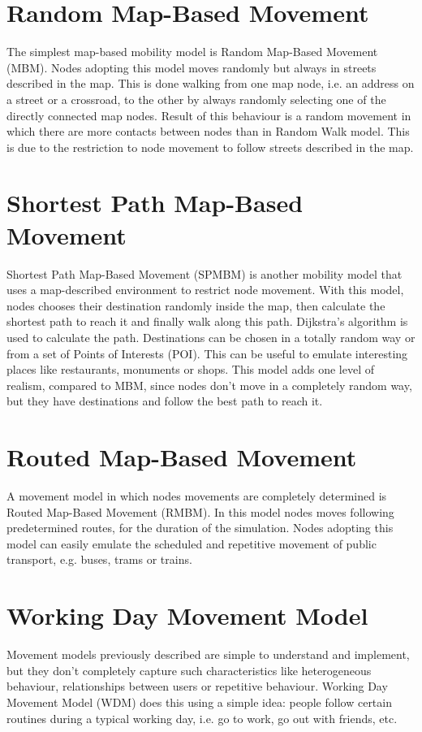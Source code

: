 \section{Random Map-Based Movement}
The simplest map-based mobility model is Random Map-Based Movement (MBM). Nodes adopting this model moves randomly but always in streets described in the map. This is done walking from one map node, i.e. an address on a street or a crossroad, to the other by always randomly selecting one of the directly connected map nodes. Result of this behaviour is a random movement in which there are more contacts between nodes than in Random Walk model. This is due to the restriction to node movement to follow streets described in the map.


\section{Shortest Path Map-Based Movement}
Shortest Path Map-Based Movement (SPMBM) is another mobility model that uses a map-described environment to restrict node movement. With this model, nodes chooses their destination randomly inside the map, then calculate the shortest path to reach it and finally walk along this path. Dijkstra's algorithm is used to calculate the path. Destinations can be chosen in a totally random way or from a set of Points of Interests (POI). This can be useful to emulate interesting places like restaurants, monuments or shops. This model adds one level of realism, compared to MBM, since nodes don't move in a completely random way, but they have destinations and follow the best path to reach it.


\section{Routed Map-Based Movement}
A movement model in which nodes movements are completely determined is Routed Map-Based Movement (RMBM). In this model nodes moves following predetermined routes, for the duration of the simulation. Nodes adopting this model can easily emulate the scheduled and repetitive movement of public transport, e.g. buses, trams or trains.


\section{Working Day Movement Model}
\label{descrWDM}
Movement models previously described are simple to understand and implement, but they don't completely capture such characteristics like heterogeneous behaviour, relationships between users or repetitive behaviour. Working Day Movement Model (WDM) \cite{articoloWdm} does this using a simple idea: people follow certain routines during a typical working day, i.e. go to work, go out with friends, etc. 
\\


